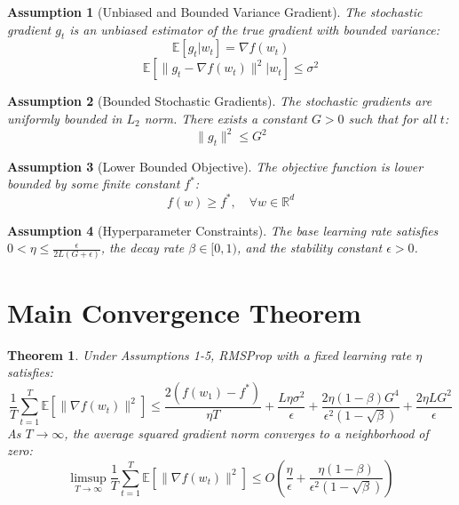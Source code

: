 \documentclass{article}
\newtheorem{theorem}{Theorem}
\newtheorem{assumption}{Assumption}
\begin{document}
\begin{assumption}[Unbiased and Bounded Variance Gradient]
The stochastic gradient $g_t$ is an unbiased estimator of the true gradient with bounded variance:
$$ \mathbb{E}[g_t | w_t] = \nabla f(w_t) $$
$$ \mathbb{E}[\|g_t - \nabla f(w_t)\|^2 | w_t] \leq \sigma^2 $$
\end{assumption}

\begin{assumption}[Bounded Stochastic Gradients]
The stochastic gradients are uniformly bounded in $L_2$ norm. There exists a constant $G > 0$ such that for all $t$:
$$ \|g_t\|^2 \leq G^2 $$
\end{assumption}

\begin{assumption}[Lower Bounded Objective]
The objective function is lower bounded by some finite constant $f^*$:
$$ f(w) \geq f^*, \quad \forall w \in \mathbb{R}^d $$
\end{assumption}

\begin{assumption}[Hyperparameter Constraints]
The base learning rate satisfies $0 < \eta \leq \frac{\epsilon}{2L(G+\epsilon)}$, the decay rate $\beta \in [0, 1)$, and the stability constant $\epsilon > 0$.
\end{assumption}

\section*{Main Convergence Theorem}
\begin{theorem}
Under Assumptions 1-5, RMSProp with a fixed learning rate $\eta$ satisfies:
$$ \frac{1}{T} \sum_{t=1}^T \mathbb{E}[\|\nabla f(w_t)\|^2] \leq \frac{2(f(w_1) - f^*)}{\eta T} + \frac{L\eta\sigma^2}{\epsilon} + \frac{2\eta(1-\beta)G^4}{\epsilon^2(1-\sqrt{\beta})} + \frac{2\eta L G^2}{\epsilon} $$
As $T \to \infty$, the average squared gradient norm converges to a neighborhood of zero:
$$ \limsup_{T \to \infty} \frac{1}{T} \sum_{t=1}^T \mathbb{E}[\|\nabla f(w_t)\|^2] \leq O\left(\frac{\eta}{\epsilon} + \frac{\eta(1-\beta)}{\epsilon^2(1-\sqrt{\beta})}\right) $$
\end{theorem}
\end{document}
